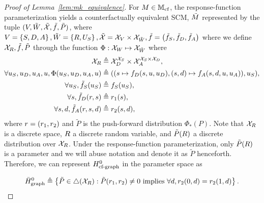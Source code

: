 \begin{proof}[Proof of Lemma~\ref{lem:mk_equivalence}]
For $M \in \mathbb{M}_{\text{cf}}$, the response-function parameterization yields a counterfactually equivalent SCM, $\tilde{M}$ represented by the tuple $(V,\tilde{W},\tilde{\mathcal{X}},\tilde{f},\tilde{P})$, where $V = \left \lbrace S, D, A \right \rbrace, \tilde{W} = \left \lbrace R, U_{S} \right \rbrace, \tilde{\mathcal{X}} =\mathcal{X}_{V}\times\mathcal{X}_{\tilde{W}}, \tilde{f} = {\left({\tilde{f}_{S}, \tilde{f}_{D}, \tilde{f}_{A}}\right)}$ where we define $\mathcal{X}_{R}, \tilde{f},\tilde{P}$ through the function $\Phi: \mathcal{X}_{W} \mapsto \mathcal{X}_{\tilde{W}}$ where
\begin{align*}
    \mathcal{X}_{R} &\triangleq \mathcal{X}_{D}^{\mathcal{X}_{S}} \times \mathcal{X}_{A}^{\mathcal{X}_{S}\times \mathcal{X}_{D}},\\
    \forall u_S,u_D,u_A,u, \Phi{\left({u_S,u_D,u_A,u}\right)} &\triangleq {\left({{\left({s \mapsto f_D(s,u,u_D),(s,d) \mapsto f_A(s,d,u,u_A)}\right)},u_S}\right)},\\
    \forall u_{S}, \tilde{f}_{S}{\left({u_S}\right)}&\triangleq f_{S}(u_{S}),\\
\forall s, \tilde{f}_{D}{\left({r,s}\right)} &\triangleq r_1{\left({s}\right)}, \\
\forall s, d, \tilde{f}_{A}{\left({r,s,d}\right)} &\triangleq r_2{\left({s,d}\right)},
\end{align*}
where $r = {\left({r_1,r_2}\right)}$ and $\tilde{P}$ is the push-forward distribution $\Phi_{*}(P)$.
Note that $\mathcal{X}_{R}$ is a discrete space, $R$ a discrete random variable, and $\tilde{P}(R)$  a discrete distribution over $\mathcal{X}_{R}$. Under the response-function parameterization, only $\tilde{P}(R)$ is a parameter and we will abuse notation and denote it as $\tilde{P}$ henceforth. Therefore, we can represent $H^0_{\text{cf-graph}}$ in the parameter space as 


\begin{equation}\label{eq:respfunc_graph_edge}
    \bar{H}^0_{\text{graph}} 
    \triangleq \left \lbrace \tilde{P} \in \triangle{\left({{\cal X}_{R}}\right)} : \tilde{P}{\left({r_1,r_2}\right)} \neq 0 \text{ implies } \forall d, r_2(0,d) = r_2{\left({1,d}\right)} \right \rbrace.
\end{equation}


\end{proof}
